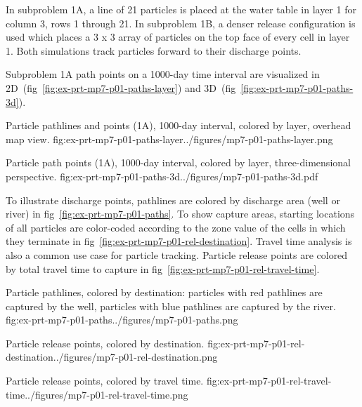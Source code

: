 In subproblem 1A, a line of 21 particles is placed at the water table in layer 1 for column 3, rows 1 through 21. In subproblem 1B, a denser release configuration is used which places a 3 x 3 array of particles on the top face of every cell in layer 1. Both simulations track particles forward to their discharge points.

Subproblem 1A path points on a 1000-day time interval are visualized in 2D~(fig~\ref{fig:ex-prt-mp7-p01-paths-layer}) and 3D~(fig~\ref{fig:ex-prt-mp7-p01-paths-3d}).

\begin{StandardFigure}{
    Particle pathlines and points (1A), 1000-day interval, colored by layer, overhead map view.
    }{fig:ex-prt-mp7-p01-paths-layer}{../figures/mp7-p01-paths-layer.png}
\end{StandardFigure}

\begin{StandardFigure}{
    Particle path points (1A), 1000-day interval, colored by layer, three-dimensional perspective.
    }{fig:ex-prt-mp7-p01-paths-3d}{../figures/mp7-p01-paths-3d.pdf}
\end{StandardFigure}

To illustrate discharge points, pathlines are colored by discharge area (well or river) in fig~\ref{fig:ex-prt-mp7-p01-paths}. To show capture areas, starting locations of all particles are color-coded according to the zone value of the cells in which they terminate in fig~\ref{fig:ex-prt-mp7-p01-rel-destination}. Travel time analysis is also a common use case for particle tracking. Particle release points are colored by total travel time to capture in fig~\ref{fig:ex-prt-mp7-p01-rel-travel-time}.

\begin{StandardFigure}{
    Particle pathlines, colored by destination: particles with red pathlines are captured by the well, particles with blue pathlines are captured by the river.
    }{fig:ex-prt-mp7-p01-paths}{../figures/mp7-p01-paths.png}
\end{StandardFigure}

\begin{StandardFigure}{
    Particle release points, colored by destination.
    }{fig:ex-prt-mp7-p01-rel-destination}{../figures/mp7-p01-rel-destination.png}
\end{StandardFigure}

\begin{StandardFigure}{
    Particle release points, colored by travel time.
    }{fig:ex-prt-mp7-p01-rel-travel-time}{../figures/mp7-p01-rel-travel-time.png}
\end{StandardFigure}